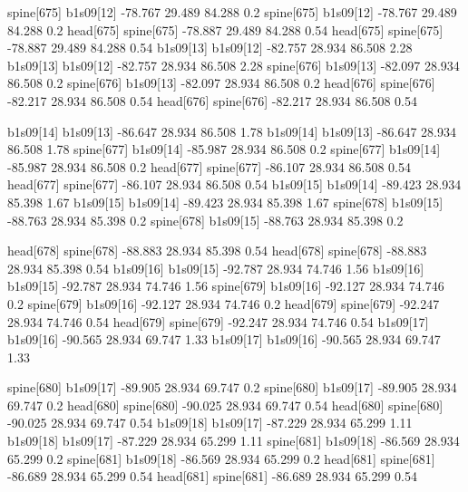 spine[675]    b1s09[12]    -78.767    29.489    84.288    0.2
spine[675]    b1s09[12]    -78.767    29.489    84.288    0.2
head[675]    spine[675]    -78.887    29.489    84.288    0.54
head[675]    spine[675]    -78.887    29.489    84.288    0.54
b1s09[13]    b1s09[12]    -82.757    28.934    86.508    2.28
b1s09[13]    b1s09[12]    -82.757    28.934    86.508    2.28
spine[676]    b1s09[13]    -82.097    28.934    86.508    0.2
spine[676]    b1s09[13]    -82.097    28.934    86.508    0.2
head[676]    spine[676]    -82.217    28.934    86.508    0.54
head[676]    spine[676]    -82.217    28.934    86.508    0.54


b1s09[14]    b1s09[13]    -86.647    28.934    86.508    1.78
b1s09[14]    b1s09[13]    -86.647    28.934    86.508    1.78
spine[677]    b1s09[14]    -85.987    28.934    86.508    0.2
spine[677]    b1s09[14]    -85.987    28.934    86.508    0.2
head[677]    spine[677]    -86.107    28.934    86.508    0.54
head[677]    spine[677]    -86.107    28.934    86.508    0.54
b1s09[15]    b1s09[14]    -89.423    28.934    85.398    1.67
b1s09[15]    b1s09[14]    -89.423    28.934    85.398    1.67
spine[678]    b1s09[15]    -88.763    28.934    85.398    0.2
spine[678]    b1s09[15]    -88.763    28.934    85.398    0.2


head[678]    spine[678]    -88.883    28.934    85.398    0.54
head[678]    spine[678]    -88.883    28.934    85.398    0.54
b1s09[16]    b1s09[15]    -92.787    28.934    74.746    1.56
b1s09[16]    b1s09[15]    -92.787    28.934    74.746    1.56
spine[679]    b1s09[16]    -92.127    28.934    74.746    0.2
spine[679]    b1s09[16]    -92.127    28.934    74.746    0.2
head[679]    spine[679]    -92.247    28.934    74.746    0.54
head[679]    spine[679]    -92.247    28.934    74.746    0.54
b1s09[17]    b1s09[16]    -90.565    28.934    69.747    1.33
b1s09[17]    b1s09[16]    -90.565    28.934    69.747    1.33


spine[680]    b1s09[17]    -89.905    28.934    69.747    0.2
spine[680]    b1s09[17]    -89.905    28.934    69.747    0.2
head[680]    spine[680]    -90.025    28.934    69.747    0.54
head[680]    spine[680]    -90.025    28.934    69.747    0.54
b1s09[18]    b1s09[17]    -87.229    28.934    65.299    1.11
b1s09[18]    b1s09[17]    -87.229    28.934    65.299    1.11
spine[681]    b1s09[18]    -86.569    28.934    65.299    0.2
spine[681]    b1s09[18]    -86.569    28.934    65.299    0.2
head[681]    spine[681]    -86.689    28.934    65.299    0.54
head[681]    spine[681]    -86.689    28.934    65.299    0.54


